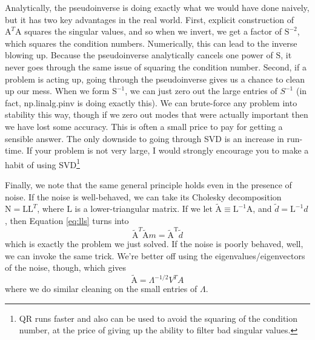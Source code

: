 \documentclass[letterpaper,11pt,preprint]{aastex}
\begin{document}
{Analytically, the pseudoinverse is doing exactly what we would have
done naively, but it has two key advantages in the real world.  First,
explicit construction of $\mathrm{A}^T\mathrm{A}$ squares the singular
values, and so when we invert, we get a factor of $\mathrm{S}^{-2}$,
which squares the condition numbers.  Numerically, this can lead to
the inverse blowing up.  Because the pseudoinverse analytically
cancels one power of $\mathrm{S}$, it never goes through the same
issue of squaring the condition number.  Second, if a problem is
acting up, going through the pseudoinverse gives us a chance to clean
up our mess.  When we form $\mathrm{S}^{-1}$, we can just zero out the
large entries of $S^{-1}$ (in fact, np.linalg.pinv is
doing exactly this).  We can brute-force any problem into stability
this way, though if we zero out modes that were actually important
then we have lost some accuracy.  This is often a small price to pay
for getting a sensible answer.  The only downside to going through SVD
is an increase in run-time.  If your problem is not very large, I
would strongly encourage you to make a habit of using SVD\footnote{QR
  runs faster and also can be used to avoid the squaring of the
  condition number, at the price of giving up the ability to filter
  bad singular values.}

Finally, we note that the same general principle holds even in the
presence of noise.  If the noise is well-behaved, we can take its
Cholesky decomposition $\mathrm{N}=\mathrm{LL}^T$, where $\mathrm{L}$
is a lower-triangular matrix.  If we let $\tilde{\mathrm{A}}\equiv
\mathrm{L}^{-1}\mathrm{A}$, and $\tilde{d}=\mathrm{L}^{-1}d$, then
Equation \ref{eq:lls} turns into
$$\mathrm{\tilde{A}}^T\mathrm{\tilde{A}}m=\mathrm{\tilde{A}^T}\tilde{d}$$
which is exactly the problem we just solved.  If the noise is poorly
behaved, well, we can invoke the same trick.  We're better off using
the eigenvalues/eigenvectors of the noise, though, which gives
$$\mathrm{\tilde{A}}=\Lambda^{-1/2}V^TA$$
where we do similar cleaning on the small entries of $\Lambda$.


}
\end{document}
